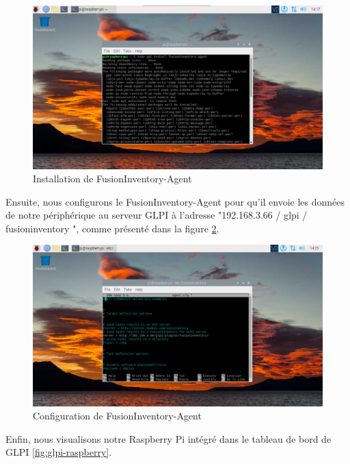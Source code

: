 \begin{figure}[H]
\centering
\includegraphics[width=15cm]{Images/raspberryfusion.png}
\caption{Installation de FusionInventory-Agent}
\label{fig:raspberry-fusion}
\end{figure}

Ensuite, nous configurons le FusionInventory-Agent pour qu'il envoie les données de notre périphérique au serveur GLPI à l'adresse "192.168.3.66 / glpi / fusioninventory ", comme présenté dans la figure \ref{fig:raspberry-fusion-config}.

\begin{figure}[H]
\centering
\includegraphics[width=15cm]{Images/raspberryfusion1.png}
\caption{Configuration de FusionInventory-Agent}
\label{fig:raspberry-fusion-config}
\end{figure}

Enfin, nous visualisons notre Raspberry Pi intégré dans le tableau de bord de GLPI \ref{fig:glpi-raspberry}.


